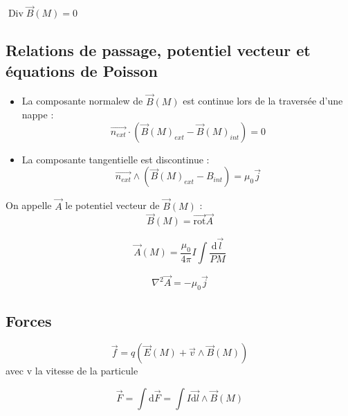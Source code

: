 \documentclass[french]{yLectureNote}
\renewcommand{\vec}{\overrightarrow}
\renewcommand{\vec}{\overrightarrow}
\newcommand{\dd}[0]{\mathrm{d}}
\newcommand{\E}{\vec{E}(M)}
\newcommand{\B}{\vec{B}(M)}
\DeclareMathOperator{\Div}{Div}
\newcommand{\rot}{\vec{\mathrm{rot}}}
\newcommand{\lap}{\nabla^2}
\begin{document}
\begin{theorem}
    $\Div \B = 0$

\end{theorem}

\subsection{Relations de passage, potentiel vecteur et équations de Poisson}

\begin{theorem}
    \begin{itemize}
    \item La composante normalew de $\B$ est continue lors de la traversée d'une nappe : $$ \vec{n_{ext}}\cdot (\B_{ext}-\B_{int})=0$$
    \item La composante tangentielle est discontinue : $$\vec{n_{ext}}\wedge (\B_{ext}-B_{int}) = \mu_0 \vec{j}$$
\end{itemize}

\end{theorem}

\begin{definition}
    On appelle $\vec{A}$ le potentiel vecteur de $\B$ : $$\B = \rot\vec{A}$$

\end{definition}
\begin{theorem}
    $$\vec{A}(M) = \frac{\mu_0}{4\pi} I\int \frac{\dd \vec{l}}{PM}$$
\end{theorem}
\begin{theorem}
    $$\lap \vec{A} = -\mu_0 \vec{j}$$

\end{theorem}

\subsection{Forces}

\begin{definition}
    $$\vec{f} = q(\E+\vec{v}\wedge \B)$$ avec v la vitesse de la particule

\end{definition}

\begin{definition}
    $$\vec{F} = \int \dd \vec{F} = \int I\vec{\dd l} \wedge \B$$

\end{definition}
\end{document}
